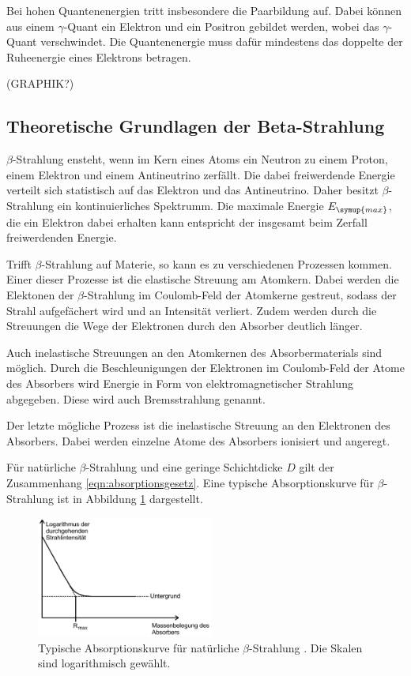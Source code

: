 Bei hohen Quantenenergien tritt insbesondere die Paarbildung auf. Dabei können aus
einem $\gamma$-Quant ein Elektron und ein Positron gebildet werden, wobei das
$\gamma$-Quant verschwindet. Die Quantenenergie muss dafür mindestens das doppelte
der Ruheenergie eines Elektrons betragen.

(GRAPHIK?)


\subsection{Theoretische Grundlagen der Beta-Strahlung} %
\label{subsec:beta}

$\beta$-Strahlung ensteht, wenn im Kern eines Atoms ein Neutron zu einem Proton, einem
Elektron und einem Antineutrino zerfällt. Die dabei freiwerdende Energie verteilt sich
statistisch auf das Elektron und das Antineutrino. Daher besitzt $\beta$-Strahlung
ein kontinuierliches Spektrumm. Die maximale Energie $E_{\symup{max}}$, die ein
Elektron dabei erhalten kann entspricht der insgesamt beim Zerfall freiwerdenden Energie.

Trifft $\beta$-Strahlung auf Materie, so kann es zu verschiedenen Prozessen kommen.
Einer dieser Prozesse ist die elastische Streuung am Atomkern. Dabei werden die
Elektonen der $\beta$-Strahlung im Coulomb-Feld der Atomkerne gestreut, sodass der
Strahl aufgefächert wird und an Intensität verliert. Zudem werden durch die Streuungen
die Wege der Elektronen durch den Absorber deutlich länger.

Auch inelastische Streuungen an den Atomkernen des Absorbermaterials sind möglich.
Durch die Beschleunigungen der Elektronen im Coulomb-Feld der Atome des Absorbers
wird Energie in Form von elektromagnetischer Strahlung abgegeben. Diese wird auch
Bremsstrahlung genannt.

Der letzte mögliche Prozess ist die inelastische Streuung an den Elektronen des
Absorbers. Dabei werden einzelne Atome des Absorbers ionisiert und angeregt.

Für natürliche $\beta$-Strahlung und eine geringe Schichtdicke $D$ gilt der
Zusammenhang \eqref{eqn:absorptionsgesetz}. Eine typische
Absorptionskurve für $\beta$-Strahlung ist in Abbildung \ref{fig:absorptionskurve}
dargestellt.

\begin{figure}
  \centering
  \includegraphics[height=4cm]{data/absorptionskurve.png}
  \caption{Typische Absorptionskurve für natürliche $\beta$-Strahlung \cite{Versuchsanleitung}.
  Die Skalen sind logarithmisch gewählt.}
  \label{fig:absorptionskurve}
\end{figure}

